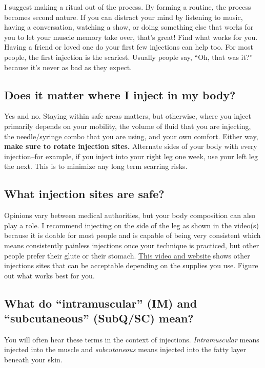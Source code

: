 \documentclass{article}
\begin{document}
I suggest making a ritual out of the process. By forming a routine, the process becomes second nature. If you can distract your mind by listening to music, having a conversation, watching a show, or doing something else that works for you to let your muscle memory take over, that’s great! Find what works for you. Having a friend or loved one do your first few injections can help too. For most people, the first injection is the scariest. Usually people say, “Oh, that was it?” because it’s never as bad as they expect.

\subsection{Does it matter where I inject in my body?}

Yes and no. Staying within safe areas matters, but otherwise, where you inject primarily depends on your mobility, the volume of fluid that you are injecting, the needle/syringe combo that you are using, and your own comfort. Either way, \textbf{make sure to rotate injection sites.} Alternate sides of your body with every injection–for example, if you inject into your right leg one week, use your left leg the next. This is to minimize any long term scarring risks.

\subsection{What injection sites are safe?}

Opinions vary between medical authorities, but your body composition can also play a role. I recommend injecting on the side of the leg as shown in the video(s) because it is doable for most people and is capable of being very consistent which means consistently painless injections once your technique is practiced, but other people prefer their glute or their stomach. \href{https://vertisis.com/articles/how-to-self-administer-a-subcutaneous-injection}{This video and website} shows other injections sites that can be acceptable depending on the supplies you use. Figure out what works best for you.

\subsection{What do “intramuscular” (IM) and “subcutaneous” (SubQ/SC) mean?}

You will often hear these terms in the context of injections. \textit{Intramuscular} means injected into the muscle and \textit{subcutaneous} means injected into the fatty layer beneath your skin.
\end{document}

